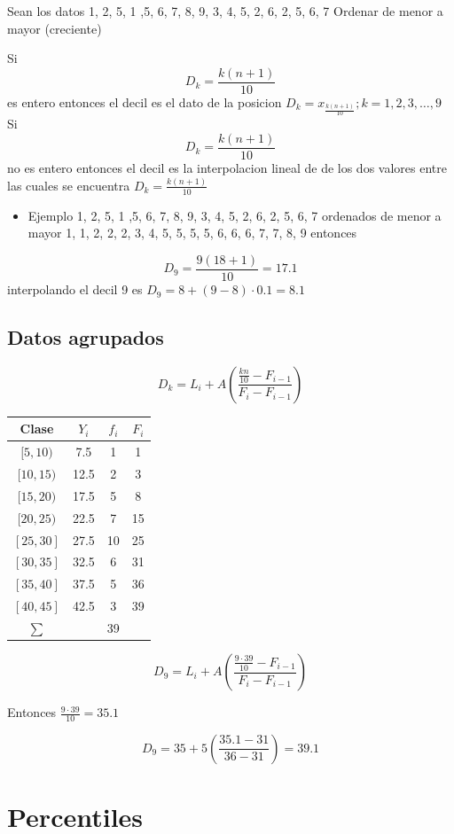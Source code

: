 \documentclass[
  11pt,
]{krantz}
\providecommand{\tightlist}{%
  \setlength{\itemsep}{0pt}\setlength{\parskip}{0pt}}
\theoremstyle{definition}
\theoremstyle{definition}
\theoremstyle{definition}
\theoremstyle{definition}
\theoremstyle{remark}
\begin{document}
Sean los datos 1, 2, 5, 1 ,5, 6, 7, 8, 9, 3, 4, 5, 2, 6, 2, 5, 6, 7 Ordenar de menor a mayor (creciente)

Si \[D_k=\frac{k(n+1)}{10}\] es entero entonces el decil es el dato de la posicion \(D_k=x_\frac{k(n+1)}{10}; k=1, 2, 3, \ldots, 9\) Si \[D_k=\frac{k(n+1)}{10}\] no es entero entonces el decil es la interpolacion lineal de de los dos valores entre las cuales se encuentra \(D_k=\frac{k(n+1)}{10}\)

\begin{itemize}
\tightlist
\item
  Ejemplo 1, 2, 5, 1 ,5, 6, 7, 8, 9, 3, 4, 5, 2, 6, 2, 5, 6, 7 ordenados de menor a mayor 1, 1, 2, 2, 2, 3, 4, 5, 5, 5, 5, 6, 6, 6, 7, 7, 8, 9 entonces
\end{itemize}

\[D_9=\frac{9(18+1)}{10}=17.1\] interpolando el decil 9 es \(D_9=8+(9-8)\cdot 0.1=8.1\)

\hypertarget{datos-agrupados-1}{%
\subsection{Datos agrupados}\label{datos-agrupados-1}}

\[D_k=L_i+ A\left(\frac{\frac{kn}{10}-F_{i-1}}{F_i-F_{i-1}}\right)\]

\begin{longtable}[]{@{}cccc@{}}
\toprule
Clase & \(Y_i\) & \(f_i\) & \(F_i\) \\
\midrule
\endhead
\([5,10)\) & 7.5 & 1 & 1 \\
\([10,15)\) & 12.5 & 2 & 3 \\
\([15,20)\) & 17.5 & 5 & 8 \\
\([20,25)\) & 22.5 & 7 & 15 \\
\([25,30]\) & 27.5 & 10 & 25 \\
\([30,35]\) & 32.5 & 6 & 31 \\
\([35,40]\) & 37.5 & 5 & 36 \\
\([40,45]\) & 42.5 & 3 & 39 \\
\(\sum\) & & 39 & \\
\bottomrule
\end{longtable}

\[D_9=L_i+ A\left(\frac{\frac{9\cdot 39}{10}-F_{i-1}}{F_i-F_{i-1}}\right)\]

Entonces \(\frac{9\cdot 39}{10}=35.1\)

\[D_9=35+ 5\left(\frac{35.1-31}{36-31}\right)=39.1\]

\hypertarget{percentiles}{%
\section{Percentiles}\label{percentiles}}
\end{document}
